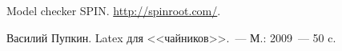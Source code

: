 \begin{thebibliography}{99}
 Model checker SPIN. \url{http://spinroot.com/}.

 Василий Пупкин. Latex для <<чайников>>.~--- М.: 2009~--- 50 c.
\end{thebibliography}

